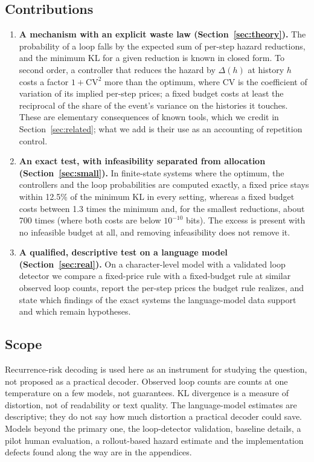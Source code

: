 \subsection{Contributions}
\begin{enumerate}[leftmargin=*,itemsep=2pt]
\item \textbf{A mechanism with an explicit waste law (Section~\ref{sec:theory}).} The probability of a loop falls by the expected sum of per-step hazard reductions, and the minimum KL for a given reduction is known in closed form. To second order, a controller that reduces the hazard by $\Delta(h)$ at history $h$ costs a factor $1+\mathrm{CV}^2$ more than the optimum, where $\mathrm{CV}$ is the coefficient of variation of its implied per-step prices; a fixed budget costs at least the reciprocal of the share of the event's variance on the histories it touches. These are elementary consequences of known tools, which we credit in Section~\ref{sec:related}; what we add is their use as an accounting of repetition control.
\item \textbf{An exact test, with infeasibility separated from allocation (Section~\ref{sec:small}).} In finite-state systems where the optimum, the controllers and the loop probabilities are computed exactly, a fixed price stays within 12.5\% of the minimum KL in every setting, whereas a fixed budget costs between 1.3 times the minimum and, for the smallest reductions, about 700 times (where both costs are below $10^{-10}$ bits). The excess is present with no infeasible budget at all, and removing infeasibility does not remove it.
\item \textbf{A qualified, descriptive test on a language model (Section~\ref{sec:real}).} On a character-level model with a validated loop detector we compare a fixed-price rule with a fixed-budget rule at similar observed loop counts, report the per-step prices the budget rule realizes, and state which findings of the exact systems the language-model data support and which remain hypotheses.
\end{enumerate}

\subsection{Scope}
Recurrence-risk decoding is used here as an instrument for studying the question, not proposed as a practical decoder. Observed loop counts are counts at one temperature on a few models, not guarantees. KL divergence is a measure of distortion, not of readability or text quality. The language-model estimates are descriptive; they do not say how much distortion a practical decoder could save. Models beyond the primary one, the loop-detector validation, baseline details, a pilot human evaluation, a rollout-based hazard estimate and the implementation defects found along the way are in the appendices.
